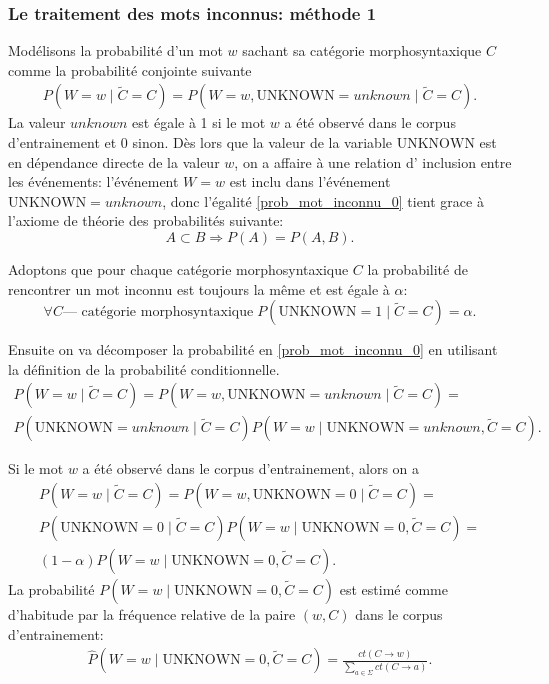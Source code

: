 \documentclass[12pt]{article}
\begin{document}
\subsubsection{Le traitement des mots inconnus: m\'ethode 1}

Mod\'elisons la probabilit\'e d'un mot $w$ sachant sa cat\'egorie morphosyntaxique $C$ comme la probabilit\'e conjointe suivante
\begin{eqnarray}
\label{prob_mot_inconnu_0}
 P(W = w \mid \tilde{C} = C) = P(W = w, \mathrm{UNKNOWN} = unknown \mid \tilde{C} = C).
\end{eqnarray}
La valeur $unknown$ est \'egale \`a 1 si le mot $w$ a \'et\'e observ\'e dans le corpus d'entrainement et 0 sinon. D\`es lors que la valeur de la variable $\mathrm{UNKNOWN}$ est en d\'ependance directe de la valeur $w$,
on a affaire \`a une relation d' inclusion entre les \'ev\'enements: l'\'ev\'enement $W = w$ est inclu dans l'\'ev\'enement $\mathrm{UNKNOWN} = unknown$, donc l'\'egalit\'e \ref{prob_mot_inconnu_0} tient grace \`a l'axiome de th\'eorie des probabilit\'es suivante:
$$ A \subset B \Rightarrow P(A) = P(A,B).$$

Adoptons que pour chaque cat\'egorie morphosyntaxique $C$ la probabilit\'e de rencontrer un mot inconnu est toujours la m\^eme et est \'egale \`a $\alpha$:
$$ \forall C \text{--- cat\'egorie morphosyntaxique} \; P(\mathrm{UNKNOWN} = 1 \mid \tilde{C} = C) = \alpha.$$

Ensuite on va d\'ecomposer la probabilit\'e en \ref{prob_mot_inconnu_0} en utilisant la d\'efinition de la probabilit\'e conditionnelle.
\begin{multline}
\label{prob_mot_inconnu_cond}
 P(W = w \mid \tilde{C} = C) = P(W = w, \mathrm{UNKNOWN} = unknown \mid \tilde{C} = C) = 
 \\
 P(\mathrm{UNKNOWN} = unknown \mid \tilde{C} = C) P(W = w \mid \mathrm{UNKNOWN} = unknown , \tilde{C} = C).
\end{multline}

 Si le mot $w$ a \'et\'e observ\'e dans le corpus d'entrainement, alors on a
\begin{multline}
\label{prob_mot_connu_1}
 P(W = w \mid \tilde{C} = C) = P(W = w, \mathrm{UNKNOWN} = 0 \mid \tilde{C} = C) = 
 \\
 P(\mathrm{UNKNOWN} = 0 \mid \tilde{C} = C) P(W = w \mid \mathrm{UNKNOWN} = 0, \tilde{C} = C) =
 \\
 (1 - \alpha) P(W = w \mid \mathrm{UNKNOWN} = 0, \tilde{C} = C).
\end{multline}
La probabilit\'e $P(W = w \mid \mathrm{UNKNOWN} = 0, \tilde{C} = C)$ est estim\'e 
comme d'habitude par la fr\'equence relative de la paire $(w, C)$ dans le corpus d'entrainement:
\begin{eqnarray*}
\hat{P}(W = w \mid \mathrm{UNKNOWN} = 0, \tilde{C} = C) =
\frac{ct(C \rightarrow w)}{\sum\limits_{a \in \Sigma}{ct(C \rightarrow a)}}.
\end{eqnarray*}
\end{document}
